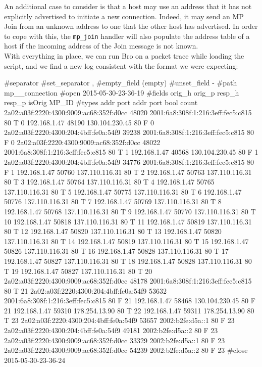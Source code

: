 An additional case to consider is that a host may use an address that it has not explicitly advertised to initiate a new connection. Indeed, it may send an MP Join from an unknown address to one that the other host has advertised. In order to cope with this, the \texttt{mp\_join} handler will also populate the address table of a host if the incoming address of the Join message is not known.\\

With everything in place, we can run Bro on a packet trace while loading the script, and we find a new log consistent with the format we were expecting: \\

\begin{code}
#separator 
#set_separator	,
#empty_field	(empty)
#unset_field	-
#path	mp__connection
#open	2015-05-30-23-36-19
#fields	orig_h	orig_p	resp_h	resp_p	isOrig  MP_ID
#types	addr	port	addr	port	bool	count
2a02:a03f:2220:4300:9009:ac68:352f:d0cc	48020	2001:6a8:308f:1:216:3eff:fec5:c815	80	T	0
192.168.1.47	48190	130.104.230.45	80	F	0
2a02:a03f:2220:4300:204:4bff:fe0a:54f9	39238	2001:6a8:308f:1:216:3eff:fec5:c815	80	F	0
2a02:a03f:2220:4300:9009:ac68:352f:d0cc	48022	2001:6a8:308f:1:216:3eff:fec5:c815	80	T	1
192.168.1.47	40568	130.104.230.45	80	F	1
2a02:a03f:2220:4300:204:4bff:fe0a:54f9	34776	2001:6a8:308f:1:216:3eff:fec5:c815	80	F	1
192.168.1.47	50760	137.110.116.31	80	T	2
192.168.1.47	50763	137.110.116.31	80	T	3
192.168.1.47	50764	137.110.116.31	80	T	4
192.168.1.47	50765	137.110.116.31	80	T	5
192.168.1.47	50775	137.110.116.31	80	T	6
192.168.1.47	50776	137.110.116.31	80	T	7
192.168.1.47	50769	137.110.116.31	80	T	8
192.168.1.47	50768	137.110.116.31	80	T	9
192.168.1.47	50770	137.110.116.31	80	T	10
192.168.1.47	50818	137.110.116.31	80	T	11
192.168.1.47	50819	137.110.116.31	80	T	12
192.168.1.47	50820	137.110.116.31	80	T	13
192.168.1.47	50820	137.110.116.31	80	T	14
192.168.1.47	50819	137.110.116.31	80	T	15
192.168.1.47	50826	137.110.116.31	80	T	16
192.168.1.47	50828	137.110.116.31	80	T	17
192.168.1.47	50827	137.110.116.31	80	T	18
192.168.1.47	50828	137.110.116.31	80	T	19
192.168.1.47	50827	137.110.116.31	80	T	20
2a02:a03f:2220:4300:9009:ac68:352f:d0cc	48178	2001:6a8:308f:1:216:3eff:fec5:c815	80	T	21
2a02:a03f:2220:4300:204:4bff:fe0a:54f9	53632	2001:6a8:308f:1:216:3eff:fec5:c815	80	F	21
192.168.1.47	58468	130.104.230.45	80	F	21
192.168.1.47	59310	178.254.13.90	80	T	22
192.168.1.47	59311	178.254.13.90	80	T	23
2a02:a03f:2220:4300:204:4bff:fe0a:54f9	53657	2002:b2fe:d5a::1	80	F	23
2a02:a03f:2220:4300:204:4bff:fe0a:54f9	49181	2002:b2fe:d5a::2	80	F	23
2a02:a03f:2220:4300:9009:ac68:352f:d0cc	33329	2002:b2fe:d5a::1	80	F	23
2a02:a03f:2220:4300:9009:ac68:352f:d0cc	54239	2002:b2fe:d5a::2	80	F	23
#close	2015-05-30-23-36-24
\end{code}

